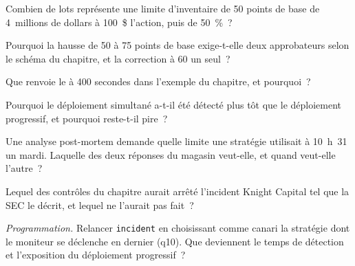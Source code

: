 \begin{exercise}[$\star$]\label{exo:pl:signal-serving-and-parameter-management:1}
Combien de lots représente une limite d'inventaire de 50 points de base de 4~millions de dollars à 100~\$ l'action, puis de 50~\%~?
\end{exercise}

\begin{exercise}[$\star$]\label{exo:pl:signal-serving-and-parameter-management:2}
Pourquoi la hausse de 50 à 75 points de base exige-t-elle deux approbateurs selon le schéma du chapitre, et la correction à 60 un seul~?
\end{exercise}

\begin{exercise}[$\star$]\label{exo:pl:signal-serving-and-parameter-management:3}
Que renvoie le  à 400 secondes dans l'exemple du chapitre, et pourquoi~?
\end{exercise}

\begin{exercise}[$\star\star$]\label{exo:pl:signal-serving-and-parameter-management:4}
Pourquoi le déploiement simultané a-t-il été détecté plus tôt que le déploiement progressif, et pourquoi reste-t-il pire~?
\end{exercise}

\begin{exercise}[$\star\star$]\label{exo:pl:signal-serving-and-parameter-management:5}
Une analyse post-mortem demande quelle limite une stratégie utilisait à 10~h~31 un mardi. Laquelle des deux réponses du magasin veut-elle, et quand veut-elle
l'autre~?
\end{exercise}

\begin{exercise}[$\star\star$]\label{exo:pl:signal-serving-and-parameter-management:6}
Lequel des contrôles du chapitre aurait arrêté l'incident Knight Capital tel que la SEC le décrit, et lequel ne l'aurait pas fait~?
\end{exercise}

\begin{exercise}[$\star\star\star$]\label{exo:pl:signal-serving-and-parameter-management:7}
\emph{Programmation.} Relancer \texttt{incident} en choisissant comme canari la stratégie dont le moniteur se déclenche en dernier (q10).
Que deviennent le temps de détection et l'exposition du déploiement progressif~?
\end{exercise}

